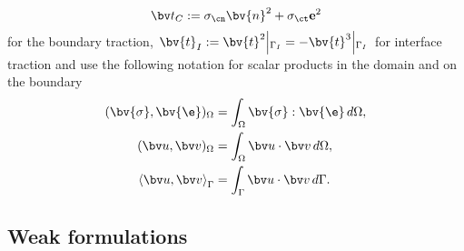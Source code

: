 \begin{equation}\label{eq:ContactTractionDefinition}
\bv t_C := \sigma_{\cn} \bv{n}^2 + \sigma_{\ct} \mathbf{e}^2
\end{equation}
 for the boundary traction, $\left.\bv{t}_I := \bv{t}^2\middle|_{\Gamma_I} = - \bv{t}^3\middle|_{\Gamma_I} \right.$ for interface traction and use the following notation for scalar products in the domain and on the boundary
\begin{align*}
( \bv{\sigma}, \bv{\e})_{\Omega} &= \int_{\Omega} \bv{\sigma} : \bv{\e} \, d\Omega,\\
(\bv u, \bv v)_{\Omega} &= \int_{\Omega} \bv u \cdot \bv v \, d\Omega,\\
\left\langle \bv u, \bv v \right\rangle_{\Gamma} &= \int_{\Gamma} \bv u \cdot \bv v \, d\Gamma.
\end{align*}
\subsection{Weak formulations}\label{sec:ElPlContact:DomainDecomposition:WeakFormulation}

